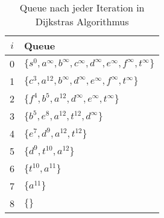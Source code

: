 \begin{table}
  \begin{tabular}{c|l}
    $i$ & Queue                                                                    \\
    \hline
    0   & $\{s^0,a^\infty,b^\infty,c^\infty,d^\infty,e^\infty,f^\infty,t^\infty\}$ \\
    1   & $\{c^3,a^{12},b^\infty,d^\infty,e^\infty,f^\infty,t^\infty\}$            \\
    2   & $\{f^4,b^5,a^{12},d^\infty,e^\infty,t^\infty\}$                          \\
    3   & $\{b^5,e^8,a^{12},t^{12},d^\infty\}$                                     \\
    4   & $\{e^7,d^9,a^{12},t^{12}\}$                                              \\
    5   & $\{d^9,t^{10},a^{12}\}$                                                  \\
    6   & $\{t^{10},a^{11}\}$                                                      \\
    7   & $\{a^{11}\}$                                                             \\
    8   & $\{\}$                                                                   \\
  \end{tabular}

  \caption{Queue nach jeder Iteration in Dijkstras Algorithmus}\label{tbl:dijkstra}
\end{table}
